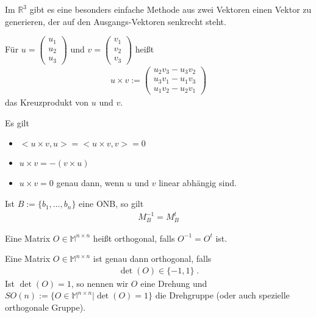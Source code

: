 Im $\mathbb{R}^3$ gibt es eine besonders einfache Methode aus zwei Vektoren einen Vektor zu generieren, der auf den Ausgangs-Vektoren
senkrecht steht.
\begin{Definition}
Für $u = \begin{pmatrix} u_1 \\ u_2 \\ u_3 \end{pmatrix}$ und $v= \begin{pmatrix} v_1 \\ v_2 \\ v_3 \end{pmatrix}$ heißt
\begin{align*}
u \times v :=  \begin{pmatrix} u_2 v_3 - u_3v_2  \\ u_3 v_1 - u_1v_3 \\ u_1 v_2 - u_2 v_1\end{pmatrix} 
\end{align*}
das Kreuzprodukt von $u$ und $v$.
\end{Definition}

\begin{Bemerkung}
Es gilt
\begin{itemize}
\item $<u \times v, u> =  <u \times v, v> = 0$ 
\item $u \times v = - (v \times u)$
\item $u \times v = 0$ genau dann, wenn $u$ und $v$ linear abhängig sind.
\end{itemize}
\end{Bemerkung}

\begin{Bemerkung}
Ist  $B:= \{ b_1, \hdots , b_n \}$  eine ONB, so gilt
\begin{align*}
M_{B}^{-1} = M_{B}^t
\end{align*}
\end{Bemerkung}

\begin{Definition}
Eine Matrix $O \in \mathbb{M}^{n \times n}$ heißt orthogonal, falls
$O^{-1} = O^t$ ist. 
\end{Definition}

\begin{Satz}
Eine Matrix $O \in \mathbb{M}^{n \times n}$ ist genau dann  orthogonal, falls
\begin{align*}
\det(O) \in  \{-1, 1 \} \; .
\end{align*}
Ist $\det(O) = 1$, so nennen wir $O$ eine Drehung und 
$SO(n) := \{ O \in \mathbb{M}^{n \times n} | \det(O) = 1\}$ die Drehgruppe (oder auch spezielle orthogonale Gruppe).
\end{Satz}

